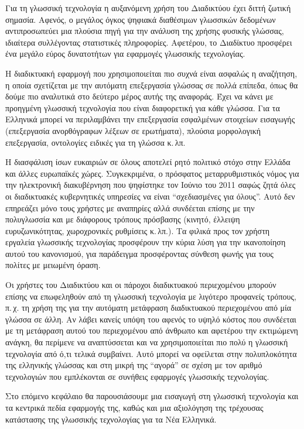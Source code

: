 \begin{multicols}{2}
Για τη γλωσσική τεχνολογία η αυξανόμενη χρήση του Διαδικτύου έχει διττή ζωτική σημασία. Αφενός, ο μεγάλος όγκος  ψηφιακά διαθέσιμων γλωσσικών δεδομένων αντιπροσωπεύει μια πλούσια πηγή για την ανάλυση της χρήσης φυσικής γλώσσας, ιδιαίτερα συλλέγοντας στατιστικές πληροφορίες. Αφετέρου, το Διαδίκτυο προσφέρει ένα μεγάλο εύρος δυνατοτήτων για εφαρμογές γλωσσικής τεχνολογίας.

Η διαδικτυακή εφαρμογή που χρησιμοποιείται πιο συχνά είναι ασφαλώς η αναζήτηση, η οποία σχετίζεται με την αυτόματη επεξεργασία γλώσσας σε πολλά επίπεδα, όπως θα δούμε πιο αναλυτικά στο δεύτερο μέρος αυτής της αναφοράς. Έχει να κάνει με προηγμένη γλωσσική τεχνολογία που είναι διαφορετική για κάθε γλώσσα. Για τα Ελληνικά μπορεί να περιλαμβάνει την επεξεργασία εσφαλμένων στοιχείων εισαγωγής (επεξεργασία ανορθόγραφων λέξεων σε ερωτήματα), πλούσια μορφολογική επεξεργασία, οντολογίες ειδικές για τη γλώσσα κ.\,λπ.
\columnbreak

Η διασφάλιση ίσων ευκαιριών σε όλους αποτελεί ρητό πολιτικό στόχο στην Ελλάδα και άλλες ευρωπαϊκές χώρες. Συγκεκριμένα, ο πρόσφατος μεταρρυθμιστικός νόμος για την ηλεκτρονική διακυβέρνηση που ψηφίστηκε τον Ιούνιο του 2011 σαφώς ζητά όλες οι διαδικτυακές κυβερνητικές υπηρεσίες να είναι “σχεδιασμένες για όλους”. Αυτό δεν επηρεάζει μόνο τους χρήστες με αναπηρίες αλλά συνδέεται επίσης με την πολυγλωσσία και με διάφορους τρόπους πρόσβασης (κινητό, έλλειψη ευρυζωνικότητας, χωροχρονικές ρυθμίσεις κ.\,λπ.). Τα φιλικά προς τον χρήστη εργαλεία γλωσσικής τεχνολογίας προσφέρουν την κύρια λύση για την ικανοποίηση αυτού του κανονισμού, για παράδειγμα προσφέροντας σύνθεση φωνής για τους πολίτες με μειωμένη όραση.

Οι χρήστες του Διαδικτύου και οι πάροχοι διαδικτυακού περιεχομένου μπορούν επίσης να επωφεληθούν από τη γλωσσική τεχνολογία με λιγότερο προφανείς τρόπους, π.\,χ. τη χρήση της για την αυτόματη μετάφραση διαδικτυακού περιεχομένου από μία γλώσσα σε άλλη. Αν λάβει κανείς υπόψη του αφενός το υψηλό κόστος που συνδέεται με τη μετάφραση αυτού του περιεχομένου από  άνθρωπο και αφετέρου την εκτιμώμενη ανάγκη, θα περίμενε να αναπτύσσεται και να χρησιμοποιείται πιο πολύ η γλωσσική τεχνολογία από ό,τι τελικά συμβαίνει. Αυτό μπορεί να οφείλεται στην πολυπλοκότητα της ελληνικής γλώσσας και στη μικρή της “αγορά” σε σχέση με τον αριθμό τεχνολογιών που εμπλέκονται σε συνήθεις εφαρμογές γλωσσικής τεχνολογίας.

Στο επόμενο κεφάλαιο θα παρουσιάσουμε μια εισαγωγή στη γλωσσική τεχνολογία και τα κεντρικά πεδία εφαρμογής της, καθώς και μια αξιολόγηση της τρέχουσας κατάστασης της γλωσσικής τεχνολογίας για τα Νέα Ελληνικά.
\end{multicols}

